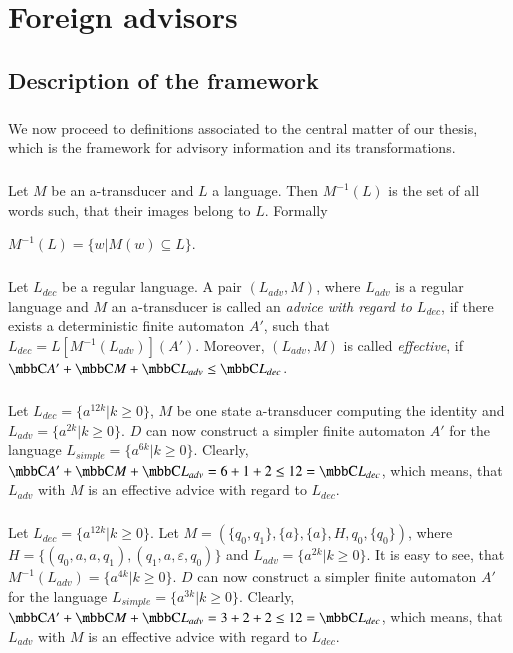 \chapter{Foreign advisors}
\label{chap:advisors}

\section{Description of the framework}
\paragraph{}
We now proceed to definitions associated to the central matter of our thesis, which is the framework for advisory information and its transformations.

\paragraph{}
 Let $M$ be an a-transducer and $L$ a language. Then $M^{-1}(L)$ is the set of all words such, that their images belong to $L$. Formally \\
\centerline{$M^{-1}(L) = \{ w | M(w) \subseteq L \}$.}

\paragraph{}
 Let $L_{dec}$ be a regular language. A pair $(L_{adv}, M)$, where $L_{adv}$ is a regular language and $M$ an a-transducer is called an \emph{advice with regard to $L_{dec}$}, if there exists a deterministic finite automaton $A'$, such that $L_{dec} = L[M^{-1}(L_{adv})](A')$. Moreover, $(L_{adv}, M)$ is called \emph{effective}, if $\C{A'} + \C{M} + \C{L_{adv}} \leq	 \C{L_{dec}}$.

\paragraph{}
\cpriklad Let $L_{dec} = \{ a^{12k}| k \geq 0 \} $, $M$ be one state a-transducer computing the identity and $L_{adv} = \{ a^{2k}| k \geq 0 \}$. $D$ can now construct a simpler finite automaton $A'$ for the language $L_{simple} = \{ a^{6k}| k \geq 0 \}$. Clearly, $\C{A'} + \C{M} + \C{L_{adv}} = 6 + 1 + 2 \leq 12 = \C{L_{dec}}$, which means, that $L_{adv}$ with $M$ is an effective advice with regard  to $L_{dec}$.

\paragraph{}
\cpriklad Let $L_{dec} = \{ a^{12k}| k \geq 0 \} $. Let $M= (\{q_0, q_1\}, \{a\}, \{a\}, H, q_0, \{q_0\})$, where $H = \{(q_0, a, a, q_1), (q_1, a, \varepsilon, q_0)\}$ and $L_{adv} = \{ a^{2k}| k \geq 0 \}$. It is easy to see, that $M^{-1}(L_{adv}) = \{ a^{4k}| k \geq 0 \}$. $D$ can now construct a simpler finite automaton $A'$ for the language $L_{simple} = \{ a^{3k}| k \geq 0 \}$. Clearly, $\C{A'} + \C{M} + \C{L_{adv}} = 3 + 2 + 2 \leq 12 = \C{L_{dec}}$, which means, that $L_{adv}$ with $M$ is an effective advice with regard  to $L_{dec}$.

